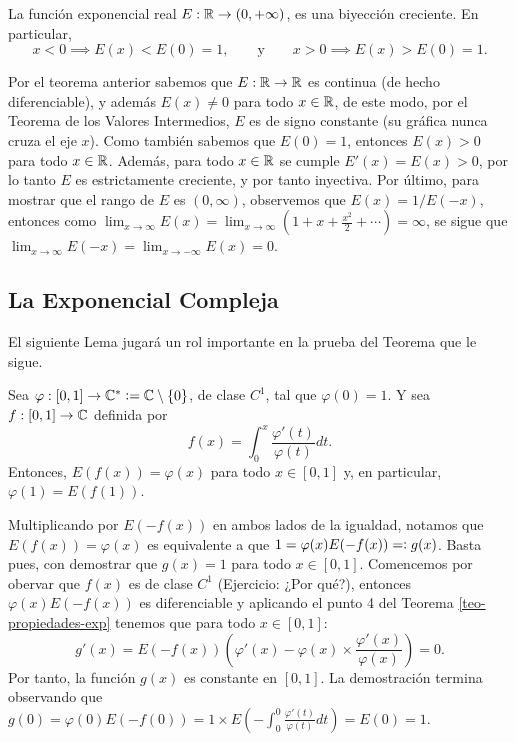 \begin{theo}\label{teo-exponencial-real}
    La función exponencial real $E: \mathbb{R} \rightarrow (0, +\infty)$, es una biyección creciente. En particular, 
    \[
    x<0 \implies E(x) < E(0) = 1, \qquad \text{y} \qquad x>0 \implies E(x) > E(0) = 1. 
    \]
\end{theo}
\begin{dem}
    Por el teorema anterior sabemos que $E: \mathbb{R} \rightarrow \mathbb{R}$ es continua (de hecho diferenciable), y además $E(x)\neq 0$ 
    para todo $x\in \mathbb{R}$, de este modo, por el Teorema de los Valores Intermedios, $E$ es de signo constante (su gráfica nunca cruza el eje $x$). Como
    también sabemos que $E(0) = 1$, entonces $E(x) > 0$ para todo $x\in \mathbb{R}$. Además, para todo $x\in \mathbb{R}$ se cumple 
    $E'(x) = E(x)>0$, por lo tanto $E$ es estrictamente creciente, y por tanto inyectiva. Por último, para mostrar que el rango de $E$ es $(0, \infty)$,
    observemos que $E(x) = 1/E(-x)$, entonces como 
    $\displaystyle\lim_{x \rightarrow \infty} E(x) = \lim_{x\rightarrow \infty} (1+x+\frac{x^2}{2} + \cdots) = \infty$,
    se sigue que $\displaystyle\lim_{x\rightarrow \infty} E(-x) = \lim_{x\rightarrow -\infty} E(x) = 0$. 
\end{dem}

\subsection{La Exponencial Compleja}
El siguiente Lema jugará un rol importante en la prueba del Teorema que le sigue.
\begin{lemma} \label{lema:integral-derivada-logaritmica}
  Sea $\varphi : [0,1]\rightarrow \mathbb{C}^{*} \vcentcolon = \mathbb{C} \setminus \{0\}$, de clase $C^1$, tal que \(\varphi(0) =1\). Y sea 
  \(f: [0,1] \rightarrow \mathbb{C}\) definida por
  \[
  f(x) = \int_{0}^{x} \frac{\varphi'(t)}{\varphi(t)}dt.
  \]
Entonces, \(E(f(x)) = \varphi(x)\) para todo \(x\in [0,1]\) y, en particular, \(\varphi(1)=E(f(1))\).
\end{lemma}
\begin{dem}
  Multiplicando por \(E(-f(x))\) en ambos lados de la igualdad, notamos que \(E(f(x)) = \varphi(x)\) es equivalente a que $1 = \varphi(x)E(-f(x))= \vcentcolon g(x)$. 
  Basta pues, con demostrar que \(g(x) = 1\) para todo \(x\in [0,1]\).
  Comencemos por obervar que \(f(x)\) es de clase $C^1$ (Ejercicio: ¿Por qué?), entonces \(\varphi(x)E(-f(x))\) es diferenciable y
  aplicando el punto 4 del Teorema \ref{teo-propiedades-exp} tenemos que para todo \(x \in [0,1]\):
  \[
  g'(x) = E(-f(x))\left(\varphi'(x) - \varphi(x)\times \frac{\varphi'(x)}{\varphi(x)} \right) = 0.
  \]
  Por tanto, la función \(g(x)\) es constante en \([0,1]\). La demostración termina observando que 
  \(g(0) = \varphi(0)E(-f(0)) = 1\times E(- \int_{0}^{0} \frac{\varphi'(t)}{\varphi(t)}dt) = E(0) =1.\) 
\end{dem}

